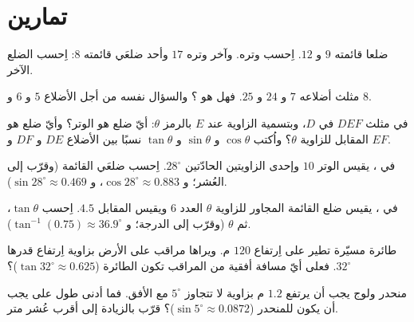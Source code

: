 \section{تمارين}

\begin{exercise}[$\star$]\label{exo:g9:trig:1}
 ضلعا قائمته $9$ و $12$. اِحسب وتره. وآخر وتره
$17$ وأحد ضلعَي قائمته $8$: اِحسب الضلع الآخر.
\end{exercise}

\begin{exercise}[$\star$]\label{exo:g9:trig:2}
مثلث أضلاعه $7$ و $24$ و $25$. فهل هو ؟ والسؤال
نفسه من أجل الأضلاع $5$ و $6$ و $8$.
\end{exercise}

\begin{exercise}[$\star$]\label{exo:g9:trig:3}
في مثلث $DEF$  في $D$، وبتسمية الزاوية عند $E$
بالرمز $\theta$: أيّ ضلع هو الوتر؟ وأيّ ضلع هو المقابل للزاوية
$\theta$؟ واُكتب $\cos\theta$ و $\sin\theta$ و $\tan\theta$ نسبًا
بين الأضلاع $DE$ و $DF$ و $EF$.
\end{exercise}

\begin{exercise}[$\star$]\label{exo:g9:trig:4}
في ، يقيس الوتر $10$ وإحدى الزاويتين الحادّتين
$28^\circ$. اِحسب ضلعَي القائمة (وقرّب إلى العُشر؛
و $\cos 28^\circ \approx 0.883$، و $\sin 28^\circ \approx 0.469$).
\end{exercise}

\begin{exercise}[$\star$]\label{exo:g9:trig:5}
في ، يقيس ضلع القائمة المجاور للزاوية $\theta$
العدد $6$ ويقيس المقابل $4.5$. اِحسب $\tan\theta$، ثم $\theta$
(وقرّب إلى الدرجة؛ و $\tan^{-1}(0.75) \approx 36.9^\circ$).
\end{exercise}

\begin{exercise}[$\star\star$]\label{exo:g9:trig:6}
طائرة مسيّرة تطير على اِرتفاع $120$ م. ويراها مراقب على الأرض
بزاوية اِرتفاع قدرها $32^\circ$. فعلى أيّ مسافة أفقية من المراقب
تكون الطائرة
($\tan 32^\circ \approx 0.625$)؟
\end{exercise}

\begin{exercise}[$\star\star$]\label{exo:g9:trig:7}
منحدر ولوج يجب أن يرتفع $1.2$ م بزاوية لا تتجاوز $5^\circ$ مع
الأفق. فما أدنى طول على  يجب أن يكون للمنحدر
($\sin 5^\circ \approx 0.0872$)؟ قرّب بالزيادة إلى أقرب عُشر
متر.
\end{exercise}

